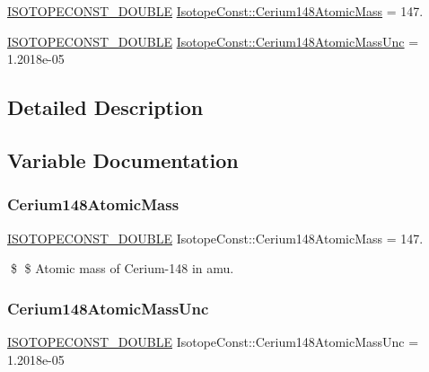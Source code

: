 \begin{DoxyCompactItemize}
\item 
\mbox{\hyperlink{group___isotope_const-_macros_ga8f45a7272ce02c0b4c65c44636ed719a}{I\+S\+O\+T\+O\+P\+E\+C\+O\+N\+S\+T\+\_\+\+D\+O\+U\+B\+LE}} \mbox{\hyperlink{group___isotope_const-_cerium-_ce148_ga7caf231f5a89e7ed3b5543cbee2061a7}{Isotope\+Const\+::\+Cerium148\+Atomic\+Mass}} = 147.
\item 
\mbox{\hyperlink{group___isotope_const-_macros_ga8f45a7272ce02c0b4c65c44636ed719a}{I\+S\+O\+T\+O\+P\+E\+C\+O\+N\+S\+T\+\_\+\+D\+O\+U\+B\+LE}} \mbox{\hyperlink{group___isotope_const-_cerium-_ce148_ga4b8892941d4c278775279944f10b6388}{Isotope\+Const\+::\+Cerium148\+Atomic\+Mass\+Unc}} = 1.\+2018e-\/05
\end{DoxyCompactItemize}


\subsection{Detailed Description}


\subsection{Variable Documentation}
\mbox{\label{group___isotope_const-_cerium-_ce148_ga7caf231f5a89e7ed3b5543cbee2061a7}} 
\subsubsection{\texorpdfstring{Cerium148\+Atomic\+Mass}{Cerium148AtomicMass}}
{\footnotesize\ttfamily \mbox{\hyperlink{group___isotope_const-_macros_ga8f45a7272ce02c0b4c65c44636ed719a}{I\+S\+O\+T\+O\+P\+E\+C\+O\+N\+S\+T\+\_\+\+D\+O\+U\+B\+LE}} Isotope\+Const\+::\+Cerium148\+Atomic\+Mass = 147.}

\$ \$ Atomic mass of Cerium-\/148 in amu. \mbox{\label{group___isotope_const-_cerium-_ce148_ga4b8892941d4c278775279944f10b6388}} 
\subsubsection{\texorpdfstring{Cerium148\+Atomic\+Mass\+Unc}{Cerium148AtomicMassUnc}}
{\footnotesize\ttfamily \mbox{\hyperlink{group___isotope_const-_macros_ga8f45a7272ce02c0b4c65c44636ed719a}{I\+S\+O\+T\+O\+P\+E\+C\+O\+N\+S\+T\+\_\+\+D\+O\+U\+B\+LE}} Isotope\+Const\+::\+Cerium148\+Atomic\+Mass\+Unc = 1.\+2018e-\/05}

